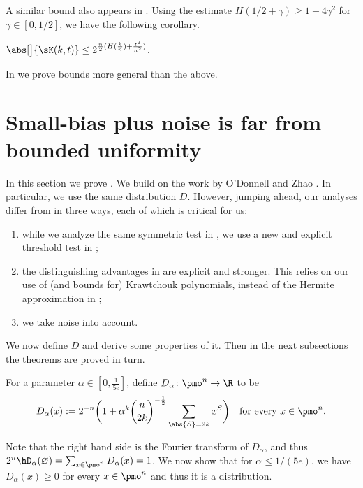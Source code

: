 A similar bound also appears in \cite[Lemma 2.1]{Pol19}.
Using the estimate $H(1/2 + \gamma) \ge 1 - 4\gamma^2$ for $\gamma \in [0,1/2]$, we have the following corollary.
\begin{corollary} \label{cor:Harm-bound}
  $\abs[\big]{\sK(k,t)} \le 2^{\frac{n}{2} (H(\frac{k}{n}) + \frac{t^2}{n^2}) }$.
\end{corollary}

In  we prove bounds more general than the above.

\section{Small-bias plus noise is far from bounded uniformity} \label{sec:sbpn-vs-uniform}

In this section we prove .  We build on the work by O’Donnell and Zhao \cite{OZ18}.  In particular, we use the same distribution $D$.  However, jumping ahead, our analyses differ from \cite{OZ18} in three ways, each of which is critical for us:
\begin{enumerate}[itemsep=0pt,parsep=2pt,topsep=3pt]
  \item while we analyze the same symmetric test in , we use a new and explicit threshold test in ;
  \item the distinguishing advantages in  are explicit and stronger.  This relies on our use of (and bounds for) Krawtchouk polynomials, instead of the Hermite approximation in \cite{OZ18};
  \item we take noise into account.
\end{enumerate}

We now define $D$ and derive some properties of it.  Then in the next subsections the theorems are proved in turn.

\begin{definition}
  For a parameter $\alpha \in [0,\frac{1}{5e}]$, define $D_\alpha \colon\pmo^n \to \R$ to be
  \[
    D_\alpha(x) := 2^{-n} \biggl(  1 + \alpha^k \binom{n}{2k}^{-\frac{1}{2}} \sum_{\abs{S}=2k} x^S \biggr) \quad \text{for every $x \in \pmo^n$.}
  \]
\end{definition}
Note that the right hand side is the Fourier transform of $D_\alpha$, and thus $2^n \hD_\alpha(\varnothing) = \sum_{x \in \pmo^n} D_\alpha(x) = 1$.
We now show that for $\alpha \le 1/(5e)$, we have $D_\alpha(x) \ge 0$ for every $x \in \pmo^n$ and thus it is a distribution.

